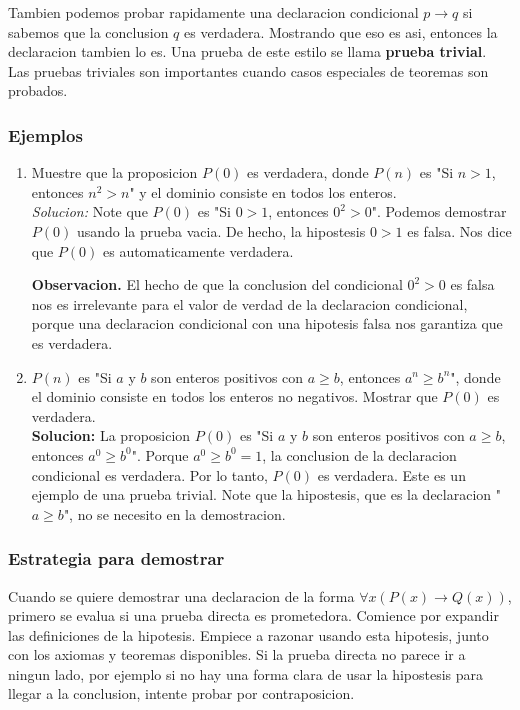 \documentclass[]{article}
\begin{document}
Tambien podemos probar rapidamente una declaracion condicional $p \rightarrow q$ si sabemos que la conclusion $q$ es verdadera. Mostrando que eso es asi, entonces la declaracion tambien lo es. Una prueba de este estilo se llama \textbf{prueba trivial}. Las pruebas triviales son importantes cuando casos especiales de teoremas son probados.

\subsubsection*{Ejemplos}

\begin{enumerate}
	\item Muestre que la proposicion $P(0)$ es verdadera, donde $P(n)$ es "Si $n > 1$, entonces $n^{2} > n$" y el dominio consiste en todos los enteros.\\
	\textit{Solucion:} Note que $P(0)$ es "Si $0 > 1$, entonces $0^{2} > 0$". Podemos demostrar $P(0)$ usando la prueba vacia. De hecho, la hipostesis $0 > 1$ es falsa. Nos dice que $P(0)$ es automaticamente verdadera.

	\textbf{Observacion.} El hecho de que la conclusion del condicional $0^{2} > 0$ es falsa nos es irrelevante para el valor de verdad de la declaracion condicional, porque una declaracion condicional con una hipotesis falsa nos garantiza que es verdadera.

	\item $P(n)$ es "Si $a$ y $b$ son enteros positivos con $a \geq b$, entonces $a^{n} \geq b^{n}$", donde el dominio consiste en todos los enteros no negativos. Mostrar que $P(0)$ es verdadera.\\
	\textbf{Solucion:} La proposicion $P(0)$ es "Si $a$ y $b$ son enteros positivos con $a \geq b$, entonces $a^{0} \geq b^{0}$". Porque $a^{0} \geq b^{0} = 1$, la conclusion de la declaracion condicional es verdadera. Por lo tanto, $P(0)$ es verdadera. Este es un ejemplo de una prueba trivial. Note que la hipostesis, que es la declaracion "$a \geq b$", no se necesito en la demostracion.
\end{enumerate}

\subsubsection*{Estrategia para demostrar}

Cuando se quiere demostrar una declaracion de la forma $\forall x(P(x) \rightarrow Q(x))$, primero se evalua si una prueba directa es prometedora. Comience por expandir las definiciones de la hipotesis. Empiece a razonar usando esta hipotesis, junto con los axiomas y teoremas disponibles. Si la prueba directa no parece ir a ningun lado, por ejemplo si no hay una forma clara de usar la hipostesis para llegar a la conclusion, intente probar por contraposicion.
\end{document}
